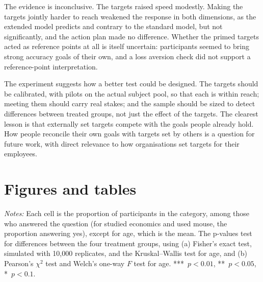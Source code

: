 \documentclass[12pt, letterpaper]{article}
\begin{document}
The evidence is inconclusive. The targets raised speed modestly. Making the targets jointly harder to reach weakened the response in both dimensions, as the extended model predicts and contrary to the standard model, but not significantly, and the action plan made no difference. Whether the primed targets acted as reference points at all is itself uncertain: participants seemed to bring strong accuracy goals of their own, and a loss aversion check did not support a reference-point interpretation.

The experiment suggests how a better test could be designed. The targets should be calibrated, with pilots on the actual subject pool, so that each is within reach; meeting them should carry real stakes; and the sample should be sized to detect differences between treated groups, not just the effect of the targets. The clearest lesson is that externally set targets compete with the goals people already hold. How people reconcile their own goals with targets set by others is a question for future work, with direct relevance to how organisations set targets for their employees.

\newpage

\printbibliography[heading=bibintoc, title={References}]

\newpage

\appendix

\renewcommand{\thefigure}{\thesection\arabic{figure}}
\renewcommand{\thetable}{\thesection\arabic{table}}

\section{Figures and tables}\label{app:figures-tables}

\begin{table}[p]
\centering
\caption{Covariates by treatment group (lab sample)}\label{tab:covariates-sumstats-lab}
\begin{threeparttable}

\begin{tablenotes}[flushleft]
\footnotesize
\item \textit{Notes:} Each cell is the proportion of participants in the category, among those who answered the question (for studied economics and used mouse, the proportion answering yes), except for age, which is the mean. The p-values test for differences between the four treatment groups, using (a) Fisher's exact test, simulated with 10,000 replicates, and the Kruskal--Wallis test for age, and (b) Pearson's $\chi^2$ test and Welch's one-way $F$ test for age. ***~$p<0.01$, **~$p<0.05$, *~$p<0.1$.
\end{tablenotes}
\end{threeparttable}
\end{table}
\end{document}
